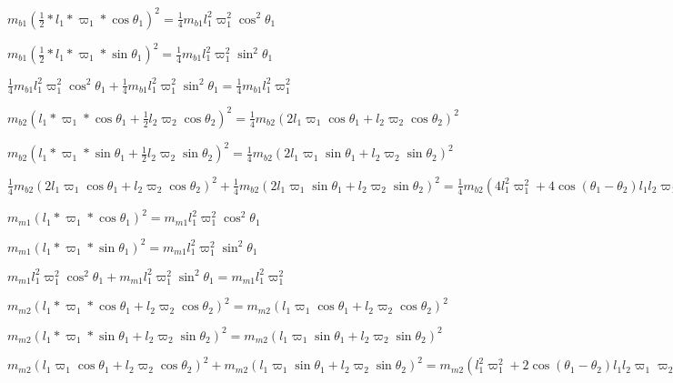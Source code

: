 \documentclass{article}
\begin{document}
$m_{b 1} (\frac{1}{2} \ast l_{1} \ast \varpi _{1} \ast \cos  \theta _{1})^{2} =\frac{1}{4} m_{b 1} l_{1}^{2} \varpi _{1}^{2} \cos ^{2} \theta _{1}$ 

$m_{b 1} (\frac{1}{2} \ast l_{1} \ast \varpi _{1} \ast \sin  \theta _{1})^{2} =\frac{1}{4} m_{b 1} l_{1}^{2} \varpi _{1}^{2} \sin ^{2} \theta _{1}$ 

$\frac{1}{4} m_{b 1} l_{1}^{2} \varpi _{1}^{2} \cos ^{2} \theta _{1} +\frac{1}{4} m_{b 1} l_{1}^{2} \varpi _{1}^{2} \sin ^{2} \theta _{1} =\frac{1}{4} m_{b 1} l_{1}^{2} \varpi _{1}^{2}$ 

$m_{b 2} (l_{1} \ast \varpi _{1} \ast \cos  \theta _{1} +\frac{1}{2} l_{2} \varpi _{2} \cos  \theta _{2})^{2} =\frac{1}{4} m_{b 2} \left (2 l_{1} \varpi _{1} \cos  \theta _{1} +l_{2} \varpi _{2} \cos  \theta _{2}\right )^{2}$ 

$m_{b 2} (l_{1} \ast \varpi _{1} \ast \sin  \theta _{1} +\frac{1}{2} l_{2} \varpi _{2} \sin  \theta _{2})^{2} =\frac{1}{4} m_{b 2} \left (2 l_{1} \varpi _{1} \sin  \theta _{1} +l_{2} \varpi _{2} \sin  \theta _{2}\right )^{2}$ 

$\frac{1}{4} m_{b 2} \left (2 l_{1} \varpi _{1} \cos  \theta _{1} +l_{2} \varpi _{2} \cos  \theta _{2}\right )^{2} +\frac{1}{4} m_{b 2} \left (2 l_{1} \varpi _{1} \sin  \theta _{1} +l_{2} \varpi _{2} \sin  \theta _{2}\right )^{2} =\frac{1}{4} m_{b 2} \left (4 l_{1}^{2} \varpi _{1}^{2} +4 \cos  \left (\theta _{1} -\theta _{2}\right ) l_{1} l_{2} \varpi _{1} \varpi _{2} +l_{2}^{2} \varpi _{2}^{2}\right )$ 

$m_{m 1} (l_{1} \ast \varpi _{1} \ast \cos  \theta _{1})^{2} =m_{m 1} l_{1}^{2} \varpi _{1}^{2} \cos ^{2} \theta _{1}$ 

$m_{m 1} (l_{1} \ast \varpi _{1} \ast \sin  \theta _{1})^{2} =m_{m 1} l_{1}^{2} \varpi _{1}^{2} \sin ^{2} \theta _{1}$ 

$m_{m 1} l_{1}^{2} \varpi _{1}^{2} \cos ^{2} \theta _{1} +m_{m 1} l_{1}^{2} \varpi _{1}^{2} \sin ^{2} \theta _{1} =m_{m 1} l_{1}^{2} \varpi _{1}^{2}$ 

$m_{m 2} (l_{1} \ast \varpi _{1} \ast \cos  \theta _{1} +l_{2} \varpi _{2} \cos  \theta _{2})^{2} =m_{m 2} \left (l_{1} \varpi _{1} \cos  \theta _{1} +l_{2} \varpi _{2} \cos  \theta _{2}\right )^{2}$ 

$m_{m 2} (l_{1} \ast \varpi _{1} \ast \sin  \theta _{1} +l_{2} \varpi _{2} \sin  \theta _{2})^{2} =m_{m 2} \left (l_{1} \varpi _{1} \sin  \theta _{1} +l_{2} \varpi _{2} \sin  \theta _{2}\right )^{2}$ 

$m_{m 2} \left (l_{1} \varpi _{1} \cos  \theta _{1} +l_{2} \varpi _{2} \cos  \theta _{2}\right )^{2} +m_{m 2} \left (l_{1} \varpi _{1} \sin  \theta _{1} +l_{2} \varpi _{2} \sin  \theta _{2}\right )^{2} =m_{m 2} \left (l_{1}^{2} \varpi _{1}^{2} +2 \cos  \left (\theta _{1} -\theta _{2}\right ) l_{1} l_{2} \varpi _{1} \varpi _{2} +l_{2}^{2} \varpi _{2}^{2}\right )$ 
\end{document}

